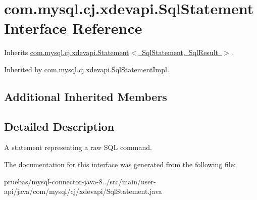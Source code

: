\hypertarget{interfacecom_1_1mysql_1_1cj_1_1xdevapi_1_1_sql_statement}{}\section{com.\+mysql.\+cj.\+xdevapi.\+Sql\+Statement Interface Reference}
\label{interfacecom_1_1mysql_1_1cj_1_1xdevapi_1_1_sql_statement}


Inherits \mbox{\hyperlink{interfacecom_1_1mysql_1_1cj_1_1xdevapi_1_1_statement}{com.\+mysql.\+cj.\+xdevapi.\+Statement$<$ Sql\+Statement, Sql\+Result $>$}}.



Inherited by \mbox{\hyperlink{classcom_1_1mysql_1_1cj_1_1xdevapi_1_1_sql_statement_impl}{com.\+mysql.\+cj.\+xdevapi.\+Sql\+Statement\+Impl}}.

\subsection*{Additional Inherited Members}


\subsection{Detailed Description}
A statement representing a raw S\+QL command. 

The documentation for this interface was generated from the following file\+:\begin{DoxyCompactItemize}
\item 
pruebas/mysql-\/connector-\/java-\/8../src/main/user-\/api/java/com/mysql/cj/xdevapi/Sql\+Statement.\+java\end{DoxyCompactItemize}
